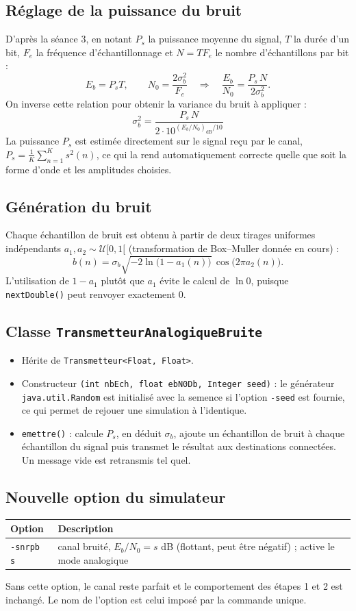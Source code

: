 \documentclass[11pt,a4paper]{article}
\newcommand{\EbNo}{E_b/N_0}
\begin{document}
\subsection{Réglage de la puissance du bruit}
D'après la séance 3, en notant $P_s$ la puissance moyenne du signal, $T$ la durée d'un bit, $F_e$ la fréquence d'échantillonnage et $N = TF_e$ le nombre d'échantillons par bit :
\[
E_b = P_s T,\qquad N_0 = \frac{2\sigma_b^2}{F_e}
\quad\Longrightarrow\quad
\frac{E_b}{N_0} = \frac{P_s\,N}{2\sigma_b^2}.
\]
On inverse cette relation pour obtenir la variance du bruit à appliquer :
\[
\boxed{\sigma_b^2 = \frac{P_s\,N}{2\cdot 10^{(\EbNo)_{\text{dB}}/10}}}
\]
La puissance $P_s$ est estimée directement sur le signal reçu par le canal, $P_s = \frac1K\sum_{n=1}^{K}s^2(n)$, ce qui la rend automatiquement correcte quelle que soit la forme d'onde et les amplitudes choisies.

\subsection{Génération du bruit}
Chaque échantillon de bruit est obtenu à partir de deux tirages uniformes indépendants $a_1, a_2\sim\mathcal U[0,1[$ (transformation de Box--Muller donnée en cours) :
\[ b(n) = \sigma_b\sqrt{-2\ln\big(1-a_1(n)\big)}\,\cos\big(2\pi a_2(n)\big). \]
L'utilisation de $1-a_1$ plutôt que $a_1$ évite le calcul de $\ln 0$, puisque \texttt{nextDouble()} peut renvoyer exactement 0.

\subsection{Classe \texttt{TransmetteurAnalogiqueBruite}}
\begin{itemize}
  \item Hérite de \texttt{Transmetteur<Float, Float>}.
  \item Constructeur \texttt{(int nbEch, float ebN0Db, Integer seed)} : le générateur \texttt{java.util.Random} est initialisé avec la semence si l'option \texttt{-seed} est fournie, ce qui permet de rejouer une simulation à l'identique.
  \item \texttt{emettre()} : calcule $P_s$, en déduit $\sigma_b$, ajoute un échantillon de bruit à chaque échantillon du signal puis transmet le résultat aux destinations connectées. Un message vide est retransmis tel quel.
\end{itemize}

\subsection{Nouvelle option du simulateur}
\begin{center}\begin{tabular}{ll}\toprule Option & Description\\\midrule
\texttt{-snrpb s} & canal bruité, $\EbNo = s$ dB (flottant, peut être négatif) ; active le mode analogique\\\bottomrule\end{tabular}\end{center}
Sans cette option, le canal reste parfait et le comportement des étapes 1 et 2 est inchangé. Le nom de l'option est celui imposé par la commande unique.
\end{document}
